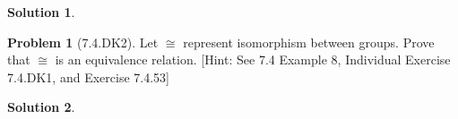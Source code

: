 \documentclass[12pt]{article}
\theoremstyle{definition}
\newtheorem*{prob}{Problem}
\newtheorem*{soln}{Solution}
\begin{document}
\begin{soln}

\end{soln}

\begin{prob}[7.4.DK2] Let $\cong$ represent isomorphism between groups.
Prove that $\cong$ is an equivalence relation.
[Hint: See 7.4 Example 8, Individual Exercise 7.4.DK1, and Exercise 7.4.53]
\end{prob}

\begin{soln}


\end{soln}
\end{document}
